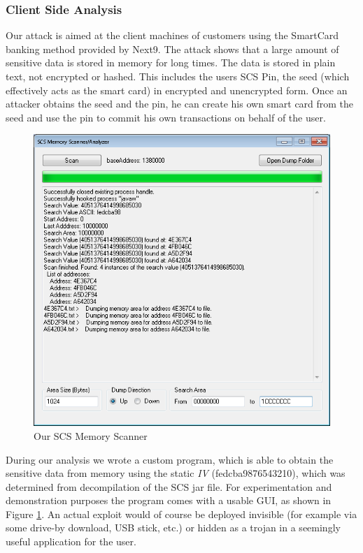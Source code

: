 \documentclass{llncs}
\begin{document}
\subsubsection{Client Side Analysis}
Our attack is aimed at the client machines of customers using the SmartCard banking method provided by Next9. The attack shows that a large amount of sensitive data is stored in memory for long times. The data is stored in plain text, not encrypted or hashed. This includes the users SCS Pin, the seed (which effectively acts as the smart card) in encrypted and unencrypted form. Once an attacker obtains the seed and the pin, he can create his own smart card from the seed and use the pin to commit his own transactions on behalf of the user.
\begin{center}
\begin{figure}[hbtp]
        \centering
        \includegraphics[scale=0.6]{Scanner.png}
        \caption{Our SCS Memory Scanner}\label{figMemoryScanner}
\end{figure}
\end{center}
During our analysis we wrote a custom program, which is able to obtain the sensitive data from memory using the static \emph{IV} (fedcba9876543210), which was determined from decompilation of the SCS jar file. For experimentation and demonstration purposes the program comes with a usable GUI, as shown in Figure \ref{figMemoryScanner}. An actual exploit would of course be deployed invisible (for example via some drive-by download, USB stick, etc.) or hidden as a trojan in a seemingly useful application for the user.
\end{document}
